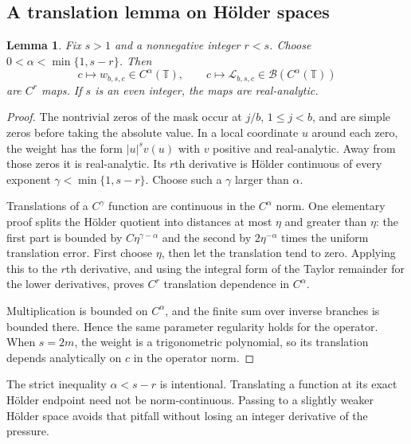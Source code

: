 \documentclass[11pt,a4paper]{article}
\numberwithin{equation}{section}
\newtheorem{lemma}[lemma]{Lemma}
\theoremstyle{definition}
\theoremstyle{remark}
\newcommand{\TT}{\mathbb T}
\newcommand{\Lop}{\mathcal L}
\begin{document}
\subsection{A translation lemma on H\"older spaces}
\begin{lemma}
\label{lem:translation}
Fix $s>1$ and a nonnegative integer $r<s$. Choose
$0<\alpha<\min\{1,s-r\}$. Then
\[
 c\longmapsto w_{b,s,c}\in C^\alpha(\TT),\qquad
 c\longmapsto\Lop_{b,s,c}\in\mathcal B(C^\alpha(\TT))
\]
are $C^r$ maps. If $s$ is an even integer, the maps are real-analytic.
\end{lemma}
\begin{proof}
The nontrivial zeros of the mask occur at $j/b$, $1\le j<b$, and are
simple zeros before taking the absolute value. In a local coordinate $u$
around each zero, the weight has the form $|u|^s v(u)$ with $v$ positive
and real-analytic. Away from those zeros it is real-analytic.
Its $r$th derivative is H\"older continuous of every exponent
$\gamma<\min\{1,s-r\}$. Choose such a $\gamma$ larger than $\alpha$.

Translations of a $C^\gamma$ function are continuous in the $C^\alpha$
norm. One elementary proof splits the H\"older quotient into distances
at most $\eta$ and greater than $\eta$: the first part is bounded by
$C\eta^{\gamma-\alpha}$ and the second by
$2\eta^{-\alpha}$ times the uniform translation error. First choose
$\eta$, then let the translation tend to zero.
Applying this to the $r$th derivative, and using the integral form of the
Taylor remainder for the lower derivatives, proves $C^r$ translation
dependence in $C^\alpha$.

Multiplication is bounded on $C^\alpha$, and the finite sum over inverse
branches is bounded there. Hence the same parameter regularity holds for
the operator. When $s=2m$, the weight is a trigonometric polynomial, so
its translation depends analytically on $c$ in the operator norm.
\end{proof}

The strict inequality $\alpha<s-r$ is intentional. Translating a function
at its exact H\"older endpoint need not be norm-continuous. Passing to a
slightly weaker H\"older space avoids that pitfall without losing an
integer derivative of the pressure.
\end{document}
